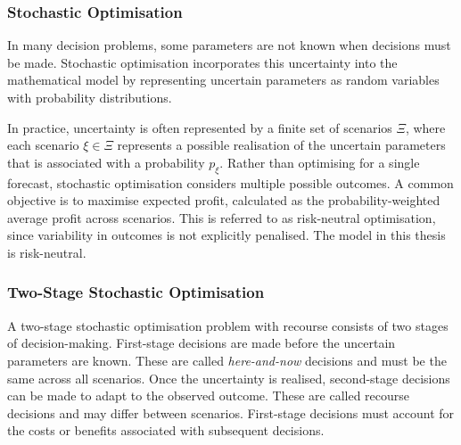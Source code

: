 \subsubsection{Stochastic Optimisation}
\label{subsec:stochastic_optimisation}

In many decision problems, some parameters are not known when decisions must be made. Stochastic optimisation incorporates this uncertainty into the mathematical model by representing uncertain parameters as random variables with probability distributions.

In practice, uncertainty is often represented by a finite set of scenarios $\Xi$, where each scenario $\xi\in\Xi$ represents a possible realisation of the uncertain parameters that is associated with a probability $p_\xi$. Rather than optimising for a single forecast, stochastic optimisation considers multiple possible outcomes. A common objective is to maximise expected profit, calculated as the probability-weighted average profit across scenarios. This is referred to as risk-neutral optimisation, since variability in outcomes is not explicitly penalised. The model in this thesis is risk-neutral.


\subsubsection{Two-Stage Stochastic Optimisation}
\label{subsec:two_stage_stochastic_optimisation}

A two-stage stochastic optimisation problem with recourse
consists of two stages of decision-making. First-stage
decisions are made before the uncertain parameters are
known. These are called \textit{here-and-now} decisions
and must be the same across all scenarios. Once the
uncertainty is realised, second-stage decisions can be
made to adapt to the observed outcome. These are called
recourse decisions and may differ between scenarios. First-stage decisions must account for the costs or benefits
associated with subsequent decisions.


